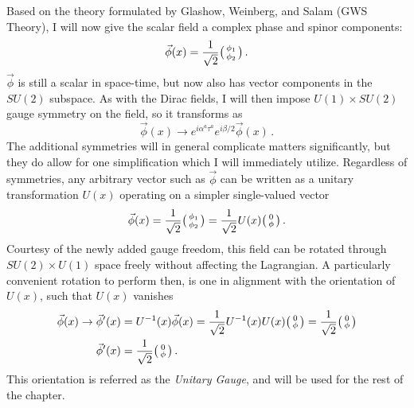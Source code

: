     Based on the theory formulated by Glashow, Weinberg, and Salam (GWS Theory),
        I will now give the scalar field a complex phase and spinor components:
    \begin{equation}
        \vec{\phi}(x) = \frac{1}{\sqrt{2}} \big(\begin{smallmatrix} \phi_1 \\ \phi_2 \end{smallmatrix}\big)
        \,.
    \end{equation}
    $\vec{\phi}$ is still a scalar in space-time, but now also has vector components in the $SU(2)$ subspace.
    As with the Dirac fields, I will then impose $U(1) \times SU(2)$ gauge symmetry on the field, so it transforms as
    \begin{equation}
        \vec{\phi}(x) \rightarrow e^{i \alpha^a \tau^a} e^{i \beta/2 } \vec{\phi}(x)
        \,.
    \end{equation}
    The additional symmetries will in general complicate matters significantly,
        but they do allow for one simplification which I will immediately utilize.
    Regardless of symmetries, any arbitrary vector such as $\vec{\phi}$ can be written as a unitary transformation $U(x)$ operating on a simpler single-valued vector
    \begin{equation}
        \vec{\phi}(x) = \frac{1}{\sqrt{2}} \big(\begin{smallmatrix} \phi_1 \\ \phi_2 \end{smallmatrix}\big) = \frac{1}{\sqrt{2}} U(x) \big(\begin{smallmatrix} 0 \\ \phi \end{smallmatrix}\big)
        \,.
    \end{equation}
    Courtesy of the newly added gauge freedom, this field can be rotated through $SU(2) \times U(1)$ space freely without affecting the Lagrangian.
    A particularly convenient rotation to perform then, is one in alignment with the orientation of $U(x)$, such that $U(x)$ vanishes
    \begin{equation} \begin{split}
        \vec{\phi}(x) \rightarrow \vec{\phi}'(x) 
            &= U^{-1}(x) \vec{\phi}(x)
            = \frac{1}{\sqrt{2}} U^{-1}(x) U(x) \big(\begin{smallmatrix} 0 \\ \phi \end{smallmatrix}\big)
            = \frac{1}{\sqrt{2}} \big(\begin{smallmatrix} 0 \\ \phi \end{smallmatrix}\big) \\
        \vec{\phi}'(x) &= \frac{1}{\sqrt{2}} \big(\begin{smallmatrix} 0 \\ \phi \end{smallmatrix}\big)
        \,.
    \end{split} \end{equation}
    This orientation is referred as the \textit{Unitary Gauge}, and will be used for the rest of the chapter.

